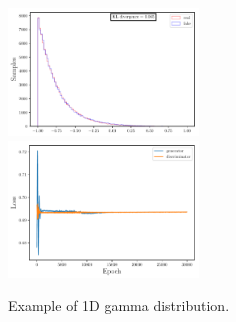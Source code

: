 \documentclass[twocolumn,preprintnumbers,superscriptaddress]{revtex4-2}
\begin{document}
\begin{figure}
  \includegraphics[width=0.45\textwidth]{plots/1Dgamma/1-distribution_100000_100_1_3_2_10000_128_0.5.pdf}\\
  \includegraphics[width=0.45\textwidth]{plots/1Dgamma/loss_100000_100_1_3_2_10000_128_0.5.pdf}
  \caption{Example of 1D gamma distribution.}
\end{figure}
\end{document}

